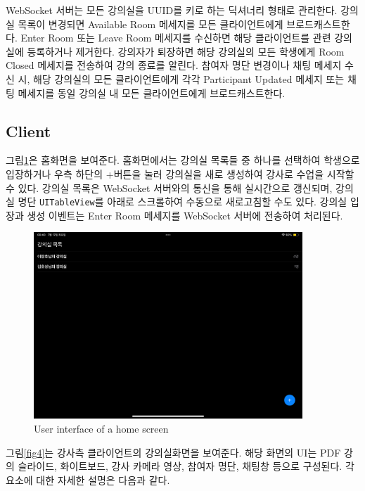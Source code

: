 \documentclass[pdflatex,sn-mathphys-num]{sn-jnl}%
\theoremstyle{thmstyleone}%
\theoremstyle{thmstyletwo}%
\theoremstyle{thmstylethree}%
\begin{document}
WebSocket 서버는 모든 강의실을 UUID를 키로 하는 딕셔너리 형태로 관리한다. 강의실 목록이 변경되면 Available Room 메세지를 모든 클라이언트에게 브로드캐스트한다. Enter Room 또는 Leave Room 메세지를 수신하면 해당 클라이언트를 관련 강의실에 등록하거나 제거한다. 강의자가 퇴장하면 해당 강의실의 모든 학생에게 Room Closed 메세지를 전송하여 강의 종료를 알린다. 참여자 명단 변경이나 채팅 메세지 수신 시, 해당 강의실의 모든 클라이언트에게 각각 Participant Updated 메세지 또는 채팅 메세지를 동일 강의실 내 모든 클라이언트에게 브로드캐스트한다.

\subsection{Client}\label{subsec4}

그림\ref{fig3}은 홈화면을 보여준다. 홈화면에서는 강의실 목록들 중 하나를 선택하여 학생으로 입장하거나 우측 하단의 +버튼을 눌러 강의실을 새로 생성하여 강사로 수업을 시작할 수 있다. 강의실 목록은 WebSocket 서버와의 통신을 통해 실시간으로 갱신되며, 강의실 명단 \verb+UITableView+를 아래로 스크롤하여 수동으로 새로고침할 수도 있다. 강의실 입장과 생성 이벤트는 Enter Room 메세지를 WebSocket 서버에 전송하여 처리된다.

\begin{figure}[H]
\centering
\includegraphics[width=0.9\textwidth]{home.PNG}
\caption{User interface of a home screen}\label{fig3}
\end{figure}

\noindent
그림\ref{fig4}는 강사측 클라이언트의 강의실화면을 보여준다. 해당 화면의 UI는 PDF 강의 슬라이드, 화이트보드, 강사 카메라 영상, 참여자 명단, 채팅창 등으로 구성된다. 각 요소에 대한 자세한 설명은 다음과 같다.
\end{document}
